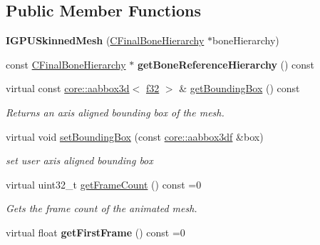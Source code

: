 \subsection*{Public Member Functions}
\begin{DoxyCompactItemize}
\item 
{\bfseries I\+G\+P\+U\+Skinned\+Mesh} (\hyperlink{classirr_1_1scene_1_1CFinalBoneHierarchy}{C\+Final\+Bone\+Hierarchy} $\ast$bone\+Hierarchy)\hypertarget{classirr_1_1scene_1_1IGPUSkinnedMesh_a689247f8e29bbbafb51a8600457254c4}{}\label{classirr_1_1scene_1_1IGPUSkinnedMesh_a689247f8e29bbbafb51a8600457254c4}

\item 
const \hyperlink{classirr_1_1scene_1_1CFinalBoneHierarchy}{C\+Final\+Bone\+Hierarchy} $\ast$ {\bfseries get\+Bone\+Reference\+Hierarchy} () const \hypertarget{classirr_1_1scene_1_1IGPUSkinnedMesh_a17c6911519d5af6cf220e07cacd998f5}{}\label{classirr_1_1scene_1_1IGPUSkinnedMesh_a17c6911519d5af6cf220e07cacd998f5}

\item 
virtual const \hyperlink{classirr_1_1core_1_1aabbox3d}{core\+::aabbox3d}$<$ \hyperlink{namespaceirr_a0277be98d67dc26ff93b1a6a1d086b07}{f32} $>$ \& \hyperlink{classirr_1_1scene_1_1IGPUSkinnedMesh_af6e2919ba3abcb6747f7b688b338ac16}{get\+Bounding\+Box} () const 
\begin{DoxyCompactList}\small\item\em Returns an axis aligned bounding box of the mesh. \end{DoxyCompactList}\item 
virtual void \hyperlink{classirr_1_1scene_1_1IGPUSkinnedMesh_a91372effa8144b0bac6f7483eccb1f66}{set\+Bounding\+Box} (const \hyperlink{namespaceirr_1_1core_adfc8fa01b30044c55f3332a1d6c1aa19}{core\+::aabbox3df} \&box)\hypertarget{classirr_1_1scene_1_1IGPUSkinnedMesh_a91372effa8144b0bac6f7483eccb1f66}{}\label{classirr_1_1scene_1_1IGPUSkinnedMesh_a91372effa8144b0bac6f7483eccb1f66}

\begin{DoxyCompactList}\small\item\em set user axis aligned bounding box \end{DoxyCompactList}\item 
virtual uint32\+\_\+t \hyperlink{classirr_1_1scene_1_1IGPUSkinnedMesh_ae55d0240ceae42379e5b5dfaa4efa0ea}{get\+Frame\+Count} () const  =0
\begin{DoxyCompactList}\small\item\em Gets the frame count of the animated mesh. \end{DoxyCompactList}\item 
virtual float {\bfseries get\+First\+Frame} () const  =0\hypertarget{classirr_1_1scene_1_1IGPUSkinnedMesh_a42a856efa06d48e11024f225fb5dc710}{}\label{classirr_1_1scene_1_1IGPUSkinnedMesh_a42a856efa06d48e11024f225fb5dc710}


\end{DoxyCompactItemize}
